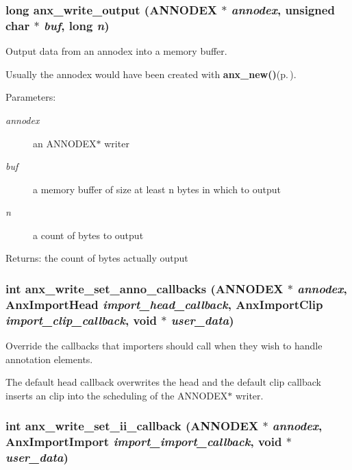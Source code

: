 \subsubsection{\setlength{\rightskip}{0pt plus 5cm}long anx\_\-write\_\-output ({\bf ANNODEX} $\ast$ {\em annodex}, unsigned char $\ast$ {\em buf}, long {\em n})}\label{anx__write_8h_a11}


Output data from an annodex into a memory buffer. 

Usually the annodex would have been created with {\bf anx\_\-new()}{\rm (p.\,\pageref{anx__general_8h_a5})}. \begin{Desc}
\item[Parameters:]
\begin{description}
\item[{\em annodex}]an ANNODEX$\ast$ writer \item[{\em buf}]a memory buffer of size at least n bytes in which to output \item[{\em n}]a count of bytes to output \end{description}
\end{Desc}
\begin{Desc}
\item[Returns:]the count of bytes actually output \end{Desc}
\subsubsection{\setlength{\rightskip}{0pt plus 5cm}int anx\_\-write\_\-set\_\-anno\_\-callbacks ({\bf ANNODEX} $\ast$ {\em annodex}, Anx\-Import\-Head {\em import\_\-head\_\-callback}, Anx\-Import\-Clip {\em import\_\-clip\_\-callback}, void $\ast$ {\em user\_\-data})}\label{anx__write_8h_a3}


Override the callbacks that importers should call when they wish to handle annotation elements. 

The default head callback overwrites the head and the default clip callback inserts an clip into the scheduling of the ANNODEX$\ast$ writer. 
\subsubsection{\setlength{\rightskip}{0pt plus 5cm}int anx\_\-write\_\-set\_\-ii\_\-callback ({\bf ANNODEX} $\ast$ {\em annodex}, Anx\-Import\-Import {\em import\_\-import\_\-callback}, void $\ast$ {\em user\_\-data})}\label{anx__write_8h_a5}


